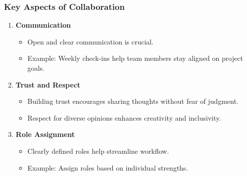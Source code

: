 \documentclass{beamer}
\begin{document}
\begin{frame}[fragile]
    \frametitle{Key Aspects of Collaboration}
    \begin{enumerate}
        \item \textbf{Communication}
        \begin{itemize}
            \item Open and clear communication is crucial.
            \item Example: Weekly check-ins help team members stay aligned on project goals.
        \end{itemize}
        
        \item \textbf{Trust and Respect}
        \begin{itemize}
            \item Building trust encourages sharing thoughts without fear of judgment.
            \item Respect for diverse opinions enhances creativity and inclusivity.
        \end{itemize}
        
        \item \textbf{Role Assignment}
        \begin{itemize}
            \item Clearly defined roles help streamline workflow.
            \item Example: Assign roles based on individual strengths.
        \end{itemize}
    \end{enumerate}
\end{frame}
\end{document}
